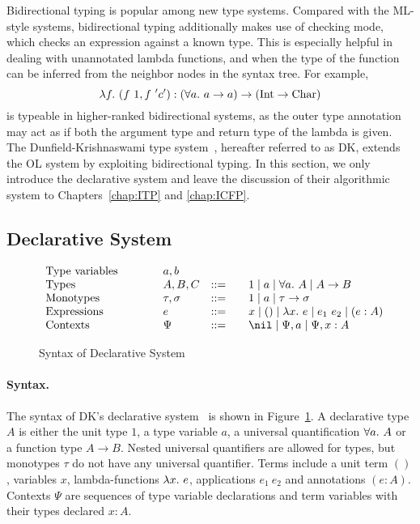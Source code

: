 Bidirectional typing is popular among new type systems.
Compared with the ML-style systems,
bidirectional typing additionally makes use of checking mode,
which checks an expression against a known type.
This is especially helpful in dealing with unannotated lambda functions,
and when the type of the function can be inferred from the neighbor nodes in the syntax tree.
For example,
$$\lam[f] (f~1, f~'c') : (\all a \to a) \to (\text{Int} \to \text{Char})$$
is typeable in higher-ranked bidirectional systems,
as the outer type annotation may act as if both the argument type and return type
of the lambda is given.
The Dunfield-Krishnaswami type system~\citep{dunfield2013complete},
hereafter referred to as DK,
extends the OL system by exploiting bidirectional typing.
In this section, we only introduce the declarative system
and leave the discussion of their algorithmic system to
Chapters~\ref{chap:ITP} and \ref{chap:ICFP}.

\subsection{Declarative System}\label{subsec:dk:decl}

\begin{figure}[t]
\[
\begin{array}{l@{\qquad}lcl}
\text{Type variables}\qquad&a, b
\\
\text{Types}\qquad&A, B, C &::=&\quad 1 \mid a \mid \all A \mid A\to B\\
\text{Monotypes}\qquad&\tau,\sigma &::=&\quad 1 \mid a \mid \tau\to \sigma
\\
\text{Expressions}\qquad&e &::=&\quad x \mid () \mid \lam e \mid e_1~e_2 \mid (e:A)
\\
\text{Contexts}\qquad&\Psi &::=&\quad \nil \mid \Psi, a \mid \Psi, x:A
\end{array}
\]
\caption{Syntax of Declarative System}\label{fig:decl:syntax}
\end{figure}

\paragraph{Syntax.}
The syntax of DK's declarative system~\citep{dunfield2013complete} is shown in Figure~\ref{fig:decl:syntax}.
A declarative type $A$ is either the unit type $1$, a type variable $a$,
a universal quantification $\all A$ or a function type $A \to B$.
Nested universal quantifiers are allowed for types,
but monotypes $\tau$ do not have any universal quantifier.
Terms include a unit term $()$, variables $x$, lambda-functions $\lam e$,
applications $e_1~e_2$ and annotations $(e:A)$.
Contexts $\Psi$ are sequences of type variable declarations and
term variables with their types declared $x:A$.

